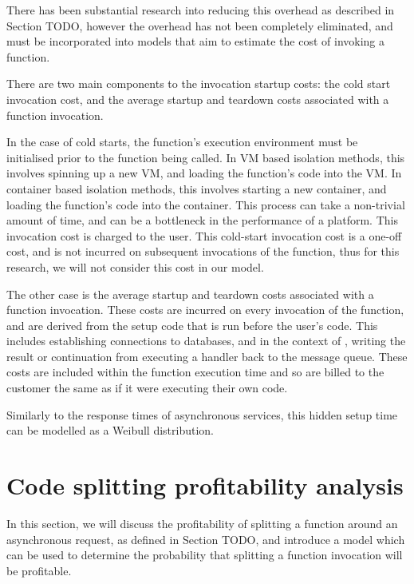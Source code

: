 There has been substantial research into reducing this overhead as described in Section TODO, however the overhead has not been completely eliminated, and must be incorporated into models that aim to estimate the cost of invoking a function.

There are two main components to the invocation startup costs: the cold start invocation cost, and the average startup and teardown costs associated with a function invocation.

In the case of cold starts, the function's execution environment must be initialised prior to the function being called. In VM based isolation methods, this involves spinning up a new VM, and loading the function's code into the VM. In container based isolation methods, this involves starting a new container, and loading the function's code into the container. This process can take a non-trivial amount of time, and can be a bottleneck in the performance of a \faas{} platform. This invocation cost is charged to the user. This cold-start invocation cost is a one-off cost, and is not incurred on subsequent invocations of the function, thus for this research, we will not consider this cost in our model.

The other case is the average startup and teardown costs associated with a function invocation. These costs are incurred on every invocation of the function, and are derived from the setup code that is run before the user's code. This includes establishing connections to databases, and in the context of \faaas{}, writing the result or continuation from executing a handler back to the message queue. These costs are included within the function execution time and so are billed to the customer the same as if it were executing their own code.

Similarly to the response times of asynchronous services, this hidden setup time can be modelled as a Weibull distribution.

\section{Code splitting profitability analysis}
\label{sec:faas-code-splitting-profitability}
In this section, we will discuss the profitability of splitting a function around an asynchronous request, as defined in Section TODO, and introduce a model which can be used to determine the probability that splitting a function invocation will be profitable.


